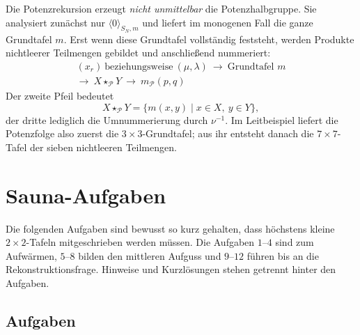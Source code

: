 \documentclass[main.tex]{subfiles}
\begin{document}
\begin{remark}
Die Potenzrekursion erzeugt \emph{nicht unmittelbar} die Potenzhalbgruppe.
Sie analysiert zunächst nur \(\langle0\rangle_{S_N,m}\) und liefert im monogenen Fall
die ganze Grundtafel \(m\).  Erst wenn diese Grundtafel vollständig feststeht,
werden Produkte nichtleerer Teilmengen gebildet und anschließend nummeriert:
\[
\boxed{
\begin{gathered}
  (x_r)\ \text{beziehungsweise}\ (\mu,\lambda)
  \ \longrightarrow\ \text{Grundtafel }m\\
  \longrightarrow\ X\star_{\mathcal P}Y
  \ \longrightarrow\ m_{\mathcal P}(p,q)
\end{gathered}
}
\]
Der zweite Pfeil bedeutet
\[
  X\star_{\mathcal P}Y
  =
  \{m(x,y)\mid x\in X,\ y\in Y\},
\]
der dritte lediglich die Umnummerierung durch \(\nu^{-1}\).  Im Leitbeispiel
liefert die Potenzfolge also zuerst die \(3\times3\)-Grundtafel; aus ihr
entsteht danach die \(7\times7\)-Tafel der sieben nichtleeren Teilmengen.
\end{remark}



\chapter{Sauna-Aufgaben}

Die folgenden Aufgaben sind bewusst so kurz gehalten, dass höchstens kleine
\(2\times2\)-Tafeln mitgeschrieben werden müssen.  Die Aufgaben
\(1\)--\(4\) sind zum Aufwärmen, \(5\)--\(8\) bilden den mittleren Aufguss
und \(9\)--\(12\) führen bis an die Rekonstruktionsfrage.  Hinweise und
Kurzlösungen stehen getrennt hinter den Aufgaben.

\section{Aufgaben}
\end{document}
